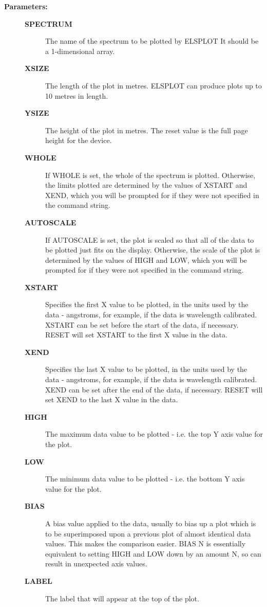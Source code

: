 \begin{description}
\item [{\bf Parameters:}]
\begin{description}
\item [{\bf SPECTRUM}]
 The name of the spectrum to be plotted by ELSPLOT
 It should be a 1-dimensional array.
\item [{\bf XSIZE}]
 The length of the plot in metres.  ELSPLOT
 can produce plots up to 10 metres in length.
\item [{\bf YSIZE}]
 The height of the plot in metres.  The reset
 value is the full page height for the device.
\item [{\bf WHOLE}]
 If WHOLE is set, the whole of the spectrum is plotted.
 Otherwise, the limits plotted are determined by the values of
 XSTART and XEND, which you will be prompted for if they were
 not specified in the command string.
\item [{\bf AUTOSCALE}]
 If AUTOSCALE is set, the plot is scaled so that all of the
 data to be plotted just fits on the display.  Otherwise,
 the scale of the plot is determined by the values of HIGH and
 LOW, which you will be prompted for if they were not specified
 in the command string.
\item [{\bf XSTART}]
 Specifies the first X value to be plotted, in the units used
 by the data - angstroms, for example, if the data is wavelength
 calibrated.  XSTART can be set before the start of the data, if
 necessary.  RESET will set XSTART to the first X value in the
 data.
\item [{\bf XEND}]
 Specifies the last X value to be plotted, in the units
 used by the data - angstroms, for example, if the data
 is wavelength calibrated.  XEND can be set after the end
 of the data, if necessary.  RESET will set XEND to the last
 X value in the data.
\item [{\bf HIGH}]
 The maximum data value to be plotted - i.e. the top Y axis
 value for the plot.
\item [{\bf LOW}]
 The minimum data value to be plotted - i.e. the bottom Y axis
 value for the plot.
\item [{\bf BIAS}]
 A bias value applied to the data, usually to bias up a
 plot which is to be superimposed upon a previous plot of
 almost identical data values.  This makes the comparison
 easier.  BIAS N  is essentially equivalent to setting HIGH
 and LOW down by an amount N, so can result in unexpected
 axis values.
\item [{\bf LABEL}]
 The label that will appear at the top of the plot.
\end{description}


\end{description}
